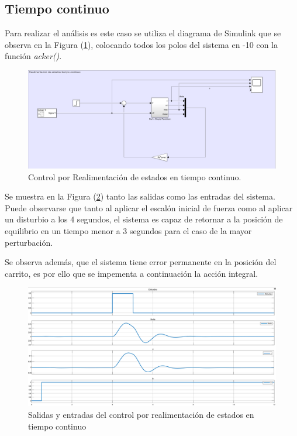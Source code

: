 \subsection{Tiempo continuo}
Para realizar el análisis es este caso se utiliza el diagrama de Simulink que se observa en la Figura (\ref{fig:onlyFeed}), colocando todos los polos del sistema en -10 con la función \textit{acker()}.
\begin{figure}[H]
	\centering
	\includegraphics[width=0.8\linewidth]{ImagenesRealimentacióndeEstados/onlyFeed}
	\caption{Control por Realimentación de estados en tiempo continuo.}	
	\label{fig:onlyFeed}
\end{figure}
Se muestra en la Figura (\ref{fig:onlyFeedOut}) tanto las salidas como las entradas del sistema. Puede observarse que tanto al aplicar el escalón inicial de fuerza como al aplicar un disturbio a los 4 segundos, el sistema es capaz de retornar a la posición de equilibrio en un tiempo menor a 3 segundos para el caso de la mayor perturbación.

Se observa además, que el sistema tiene error permanente en la posición del carrito, es por ello que se impementa a continuación la acción integral.
\begin{figure}[H]
	\centering
	\includegraphics[width=0.8\linewidth]{ImagenesRealimentacióndeEstados/onlyFeedOut}
	\caption{Salidas y entradas del control por realimentaci\'on de estados en tiempo continuo}	
	\label{fig:onlyFeedOut}
\end{figure}

